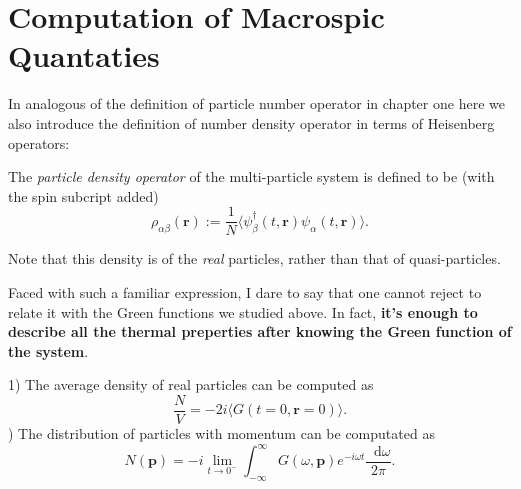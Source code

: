 \documentclass[b5paper,10pt,UTF8]{book}
\newcommand*\dd{\mathop{}\!\mathrm{d}}
\numberwithin{equation}{section}
\begin{document}
	\section{Computation of Macrospic Quantaties}
		In analogous of the definition of particle number operator in chapter one here we also introduce the definition of number density operator in terms of Heisenberg operators:
		\begin{Def}
			The \emph{particle density operator} of the multi-particle system is defined to be (with the spin subcript added)
			\begin{equation}\label{2.5.1}
				\rho_{\alpha\beta}(\bm{r}):=\dfrac{1}{N}\langle\psi_\beta^\dagger(t,\bm{r})\psi_\alpha(t,\bm{r})\rangle.
			\end{equation}
		\end{Def}
		\begin{Note}
			Note that this density is of the \emph{real} particles, rather than that of quasi-particles.
		\end{Note}
		Faced with such a familiar expression, I dare to say that one cannot reject to relate it with the Green functions we studied above. In fact, \textbf{it's enough to describe all the thermal preperties after knowing the Green function of the system}.
		\begin{Proposition}
			\hfill\par
			1) The average density of real particles can be computed as
			\begin{equation}\label{2.5.2}
				\dfrac{N}{V}=-2i\langle G(t=0,\bm{r}=0)
				\rangle.
			\end{equation}
			) The distribution of particles with momentum can be computated as 
			\begin{equation}\label{2.5.3}
			N(\bm{p})=-i\lim_{t\rightarrow0^-}\int_{-\infty}^{\infty}G(\omega,\bm{p})e^{-i\omega t}\dfrac{\dd \omega}{2\pi}.
			\end{equation}
		\end{Proposition}
\end{document}
